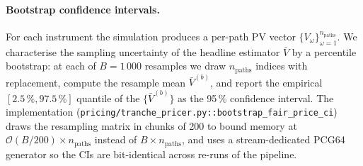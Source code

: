 \paragraph{Bootstrap confidence intervals.}
For each instrument the simulation produces a per-path PV vector
$\{V_\omega\}_{\omega = 1}^{n_{\text{paths}}}$. We characterise the
sampling uncertainty of the headline estimator $\bar V$ by a percentile
bootstrap: at each of $B = 1\,000$ resamples we draw $n_{\text{paths}}$
indices with replacement, compute the resample mean
$\bar V^{(b)}$, and report the empirical
$[2.5\,\%, 97.5\,\%]$ quantile of the $\{\bar V^{(b)}\}$ as the
95\,\% confidence interval. The implementation
(\texttt{pricing/tranche\_pricer.py::bootstrap\_fair\_price\_ci}) draws
the resampling matrix in chunks of 200 to bound memory at
$\mathcal{O}(B/200) \times n_{\text{paths}}$ instead of $B \times
n_{\text{paths}}$, and uses a stream-dedicated PCG64 generator so the CIs
are bit-identical across re-runs of the pipeline.

